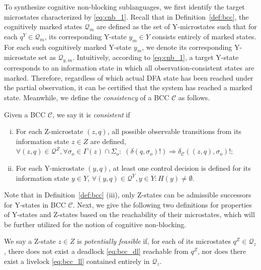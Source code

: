 \documentclass[journal,twoside,web]{ieeecolor}
\begin{document}
To synthesize cognitive non-blocking sublanguages, we first identify the
target microstates characterized by \eqref{eq:cnb_1}.
%
Recall that in Definition~\ref{def:bcc}, the cognitively marked states $\bm{\mathcal{Q}}_m$ are defined as the set of Y-microstates such that for each $q^Y \in \bm{\mathcal{Q}}_m$, its corresponding Y-state $y_m \in Y$ consists entirely of marked states. 
For each such cognitively marked Y-state $y_m$, we denote its corresponding Y-microstate set as $\bm{\mathcal{Q}}_{y,m}$.
%
Intuitively, according to \eqref{eq:cnb_1}, a target Y-state corresponds to an information state in which all observation-consistent states are marked. 
Therefore, regardless of which actual DFA state has been reached under the partial observation, it can be certified that the system has reached a marked state.
%
Meanwhile, we define the \emph{consistency} of a BCC $\mathcal{C}$ as follows.
%
\begin{definition}\label{def:con_bcc}
Given a BCC $\mathcal{C}$, we say it is \emph{consistent} if
\begin{enumerate}[(i)]
    \item For each Z-microstate $(z, q)$, all possible observable transitions from its information state $z \in Z$ are defined, 
    $
    \forall (z, q) \in \bm{\mathcal{Q}}^Z, \forall \sigma_o \in \Gamma(z)\cap\Sigma_o:\;
    (\delta(q,\sigma_o)!) \Rightarrow \delta_{\mathcal{C}}((z, q), \sigma_o)!;    
    $
    \item For each Y-microstate $(y, q)$, at least one control decision is defined for its information state $y \in Y$, 
    $
    \forall (y, q) \in \bm{\mathcal{Q}}^Y, y \in Y : H(y) \neq \emptyset.
    $
\end{enumerate}
\end{definition}
%
Note that in Definition~\ref{def:bcc} (iii), only Z-states can be admissible successors for Y-states in BCC $\mathcal{C}$.
%
Next, we give the following two definitions for properties of Y-states and Z-states based on the reachability of their microstates, which will be further utilized for the notion of cognitive non-blocking.
%
\begin{definition}\label{def:z_pf}
    We say a Z-state $z \in Z$ is \emph{potentially feasible} if, for each of its microstates $q^Z \in \bm{\mathcal{Q}}_z$, there does not exist a deadlock \eqref{eq:bcc_dl} reachable from $q^Z$, nor does there exist a livelock \eqref{eq:bcc_ll} contained entirely in $\bm{\mathcal{Q}}_z$.
\end{definition}
\end{document}
